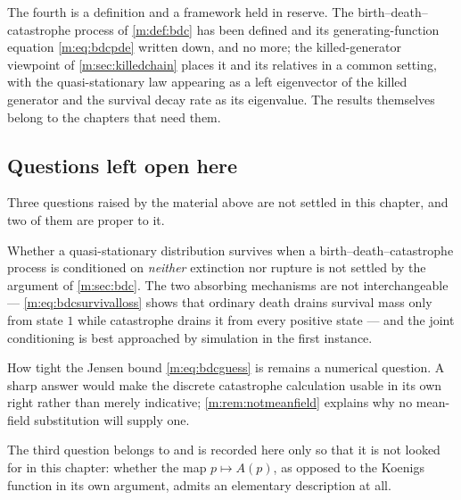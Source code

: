 The fourth is a definition and a framework held in reserve. The
birth--death--catastrophe process of \cref{m:def:bdc} has been defined and its
generating-function equation \cref{m:eq:bdcpde} written down, and no more; the
killed-generator viewpoint of \cref{m:sec:killedchain} places it and its relatives
in a common setting, with the quasi-stationary law appearing as a left eigenvector
of the killed generator and the survival decay rate as its eigenvalue. The results
themselves belong to the chapters that need them.

\subsection*{Questions left open here}

Three questions raised by the material above are not settled in this chapter, and
two of them are proper to it.

Whether a quasi-stationary distribution survives when a birth--death--catastrophe
process is conditioned on \emph{neither} extinction nor rupture is not settled by
the argument of \cref{m:sec:bdc}. The two absorbing mechanisms are not
interchangeable --- \cref{m:eq:bdcsurvivalloss} shows that ordinary death drains
survival mass only from state $1$ while catastrophe drains it from every positive
state --- and the joint conditioning is best approached by simulation in the first
instance.

How tight the Jensen bound \cref{m:eq:bdcguess} is remains a numerical question. A
sharp answer would make the discrete catastrophe calculation usable in its own
right rather than merely indicative; \cref{m:rem:notmeanfield} explains why no
mean-field substitution will supply one.

The third question belongs to \ChA{} and is recorded here only so that it is not
looked for in this chapter: whether the map $p\mapsto A(p)$, as opposed to the
Koenigs function in its own argument, admits an elementary description at all.

\FloatBarrier
